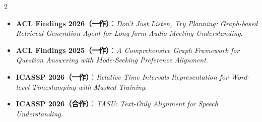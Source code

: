 \documentclass[10pt,a4paper,withhyper,normalphoto]{altacv}
\begin{document}
\begin{paracol}{2}
\begin{itemize}
    \item \textbf{ACL Findings 2026（一作）}：\textit{Don't Just Listen, Try Planning: Graph-based Retrieval-Generation Agent for Long-form Audio Meeting Understanding}.
    \item \textbf{ACL Findings 2025（一作）}：\textit{A Comprehensive Graph Framework for Question Answering with Mode-Seeking Preference Alignment}.
    \item \textbf{ICASSP 2026（一作）}：\textit{Relative Time Intervals Representation for Word-level Timestamping with Masked Training}.
    \item \textbf{ICASSP 2026（合作）}：\textit{TASU: Text-Only Alignment for Speech Understanding}.
\end{itemize}



\smallskip
{}

\smallskip
{}

\end{paracol}
\end{document}
